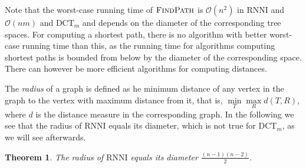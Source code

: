 \documentclass[11pt]{amsart}
\newtheorem{theorem}{Theorem}
\newcommand{\rnni}{\mathrm{RNNI}}
\newcommand{\findpath}{\textsc{FindPath}}
\newcommand{\dtt}{\mathrm{DCT}}
\renewcommand{\O}{\mathcal O}
\newcommand{\summary}[1]{} %
\begin{document}
Note that the worst-case running time of $\findpath$ is $\O(n^2)$ in $\rnni$ and $\O(nm)$ and $\dtt_m$ and depends on the diameter of the corresponding tree spaces.
For computing a shortest path, there is no algorithm with better worst-case running time than this, as the running time for algorithms computing shortest paths is bounded from below by the diameter of the corresponding space.
There can however be more efficient algorithms for computing distances.

\summary{Radius of $\rnni$ is equal to its diameter.}
The \emph{radius} of a graph is defined as he minimum distance of any vertex in the graph to the vertex with maximum distance from it, that is, $\min\limits_{T}\max\limits_{R} d(T,R)$, where $d$ is the distance measure in the corresponding graph.
In the following we see that the radius of $\rnni$ equals its diameter, which is not true for $\dtt_m$, as we will see afterwards.

\begin{theorem}
	The radius of $\rnni$ equals its diameter $\frac{(n-1)(n-2)}{2}$.
	\label{thm:radius_rnni}
\end{theorem}
\end{document}
